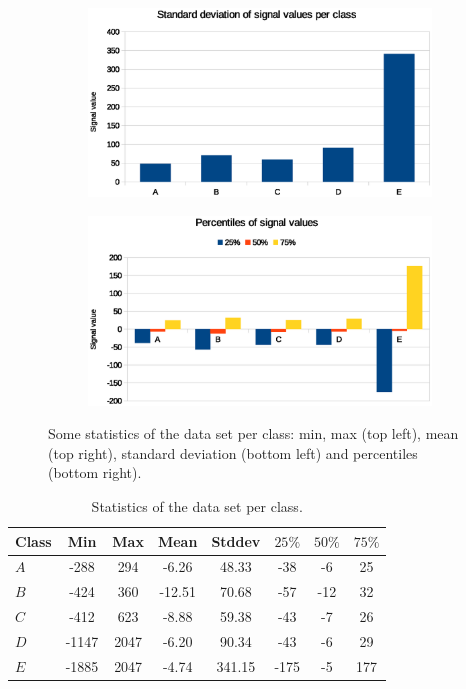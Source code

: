 \documentclass[12pt]{article}
\begin{document}
\begin{figure}
\begin{subfigure}{.5\textwidth}
  \centering
  \includegraphics[width=.8\linewidth]{figures/std.eps}
\end{subfigure}%
\begin{subfigure}{.5\textwidth}
  \centering
  \includegraphics[width=.8\linewidth]{figures/percentiles.eps}
\end{subfigure}
\caption{Some statistics of the data set per class: min, max (top left), mean (top right), standard deviation (bottom left) and percentiles (bottom right).}
\label{fig:statistics}
\end{figure}

\begin{table}
\begin{center}
\begin{tabular}{|l||c|c|c|c|c|c|c|}
\hline
Class & Min & Max & Mean & Stddev & $25\%$ & $50\%$ & $75\%$ \\ \hline \hline
$A$ & -288 & 294 & -6.26 & 48.33 & -38 & -6 & 25 \\ \hline
$B$ & -424 & 360 & -12.51 & 70.68 & -57 & -12 &	32 \\ \hline
$C$ & -412 & 623 & -8.88 & 59.38 & -43 & -7 & 26 \\ \hline
$D$ & -1147 & 2047 & -6.20 & 90.34 & -43 & -6 & 29 \\ \hline
$E$ & -1885 & 2047 & -4.74 & 341.15 & -175 & -5 & 177 \\ \hline
\end{tabular}
\caption{Statistics of the data set per class.}
\label{tab:statistics}
\end{center}
\end{table}
\end{document}

